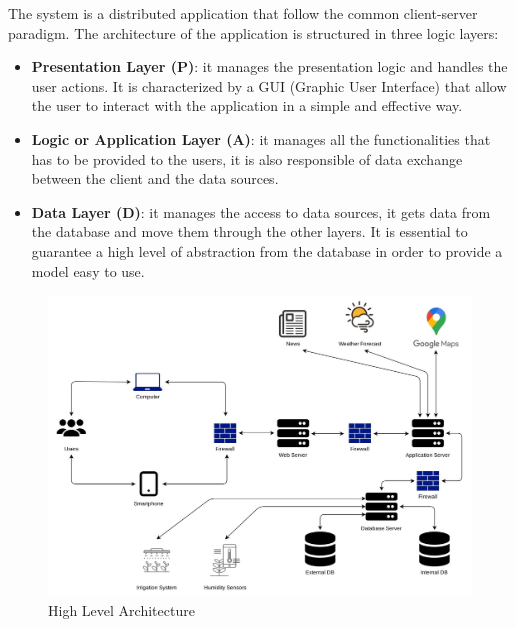 \documentclass[table, 12pt]{article}
\begin{document}
The system is a distributed application that follow the common client-server paradigm.
The architecture of the application is structured in three logic layers:
\begin{itemize}
    \item \textbf{Presentation Layer (P)}: it manages the presentation logic and handles the user actions.
    It is characterized by a GUI (Graphic User Interface) that allow the user to interact with the application in a simple and effective way.
    \item \textbf{Logic or Application Layer (A)}: it manages all the functionalities that has to be provided to the users, it is also responsible of data exchange between the client and the data sources.
    \item \textbf{Data Layer (D)}: it manages the access to data sources, it gets data from the database and move them through the other layers.
    It is essential to guarantee a high level of abstraction from the database in order to provide a model easy to use.
\end{itemize}

\begin{center}
    \begin{figure}[H]
        \includegraphics[scale=0.70, center]{assets/4-tier-architecture-scheme.jpg}
        \caption{High Level Architecture}
        \label{fig: high_level_architecture}
    \end{figure}
\end{center}
\end{document}
